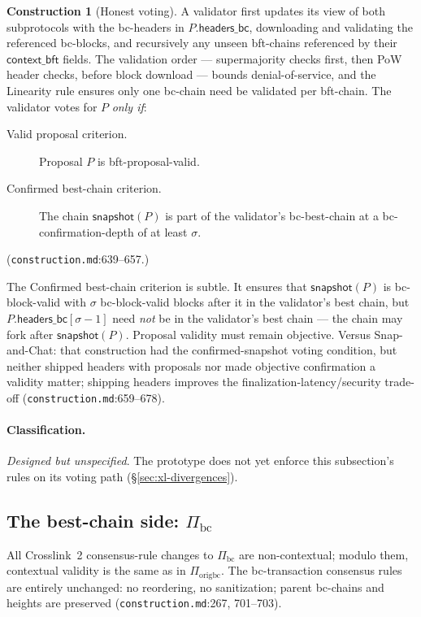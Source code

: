 \documentclass[11pt,a4paper]{article}
\theoremstyle{definition}
\newtheorem{construction}[theorem]{Construction}
\begin{document}
\begin{construction}[Honest voting]\label{def:xl-honest-voting}
A validator first updates its view of both subprotocols with the
bc-headers in $P.\mathsf{headers\_bc}$, downloading and validating the
referenced bc-blocks, and recursively any unseen bft-chains referenced by
their $\mathsf{context\_bft}$ fields. The validation order ---
supermajority checks first, then PoW header checks, before block download
--- bounds denial-of-service, and the Linearity rule ensures only one
bc-chain need be validated per bft-chain. The validator votes for $P$
\emph{only if}:
\begin{description}
\item[Valid proposal criterion.] Proposal $P$ is bft-proposal-valid.
\item[Confirmed best-chain criterion.] The chain $\mathsf{snapshot}(P)$ is
  part of the validator's bc-best-chain at a bc-confirmation-depth of at
  least $\sigma$.
\end{description}
(\texttt{construction.md}:639--657.)
\end{construction}

The Confirmed best-chain criterion is subtle. It ensures that
$\mathsf{snapshot}(P)$ is bc-block-valid with $\sigma$ bc-block-valid
blocks after it in the validator's best chain, but
$P.\mathsf{headers\_bc}[\sigma - 1]$ need \emph{not} be in the
validator's best chain --- the chain may fork after
$\mathsf{snapshot}(P)$. Proposal validity must remain objective. Versus
Snap-and-Chat: that construction had the confirmed-snapshot voting
condition, but neither shipped headers with proposals nor made objective
confirmation a validity matter; shipping headers improves the
finalization-latency/security trade-off
(\texttt{construction.md}:659--678).

\paragraph{Classification.} \emph{Designed but unspecified}. The
prototype does not yet enforce this subsection's rules on its voting path
(\S\ref{sec:xl-divergences}).

\subsection{The best-chain side: $\Pi_{\mathrm{bc}}$}\label{sec:xl-bc}

All Crosslink~2 consensus-rule changes to $\Pi_{\mathrm{bc}}$ are
non-contextual; modulo them, contextual validity is the same as in
$\Pi_{\mathrm{origbc}}$. The bc-transaction consensus rules are entirely
unchanged: no reordering, no sanitization; parent bc-chains and heights
are preserved (\texttt{construction.md}:267, 701--703).
\end{document}
